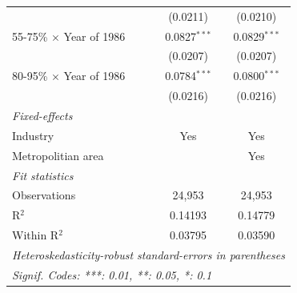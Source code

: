 \documentclass[
  12pt]{article}
\theoremstyle{definition}
\theoremstyle{remark}
\begin{document}
\begin{table}
\begin{tabular}{lcc}
                                   & (0.0211)       & (0.0210)\\   
   55-75\% $\times$ Year of 1986   & 0.0827$^{***}$ & 0.0829$^{***}$\\   
                                   & (0.0207)       & (0.0207)\\   
   80-95\% $\times$ Year of 1986   & 0.0784$^{***}$ & 0.0800$^{***}$\\   
                                   & (0.0216)       & (0.0216)\\   
   \midrule
   \emph{Fixed-effects}\\
   Industry                        & Yes            & Yes\\  
   Metropolitian area              &                & Yes\\  
   \midrule
   \emph{Fit statistics}\\
   Observations                    & 24,953         & 24,953\\  
   R$^2$                           & 0.14193        & 0.14779\\  
   Within R$^2$                    & 0.03795        & 0.03590\\  
   \midrule \midrule
   \multicolumn{3}{l}{\emph{Heteroskedasticity-robust standard-errors in parentheses}}\\
   \multicolumn{3}{l}{\emph{Signif. Codes: ***: 0.01, **: 0.05, *: 0.1}}\\
\end{tabular}
\end{table}

\par\endgroup
\end{document}
